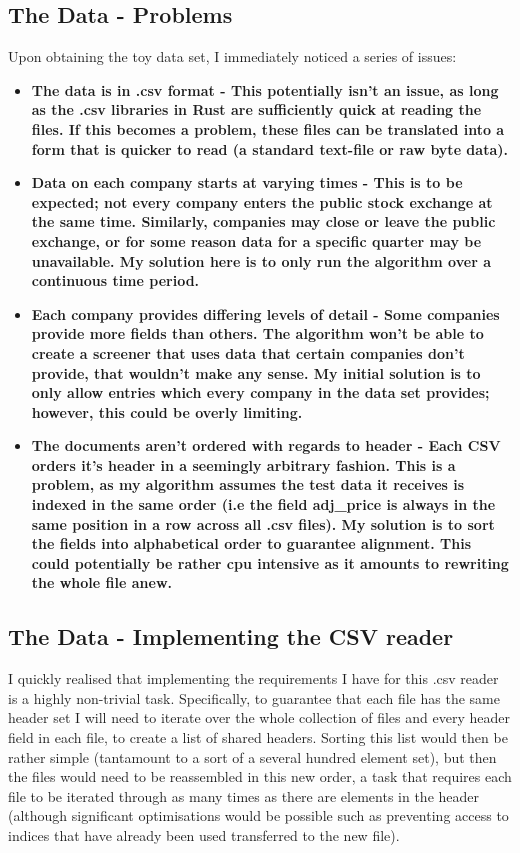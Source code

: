\subsection{The Data - Problems}
Upon obtaining the toy data set, I immediately noticed a series of issues:
\begin{itemize}
    \item \bf The data is in .csv format \rm - This potentially isn't an issue, as long as the .csv libraries in Rust are sufficiently quick at reading the files. If this becomes a problem, these files can be translated into a form that is quicker to read (a standard text-file or raw byte data).
    \item \bf Data on each company starts at varying times \rm - This is to be expected; not every company enters the public stock exchange at the same time. Similarly, companies may close or leave the public exchange, or for some reason data for a specific quarter may be unavailable. My solution here is to only run the algorithm over a continuous time period.
    \item \bf Each company provides differing levels of detail \rm - Some companies provide more fields than others. The algorithm won't be able to create a screener that uses data that certain companies don't provide, that wouldn't make any sense. My initial solution is to only allow entries which every company in the data set provides; however, this could be overly limiting.
    \item \bf The documents aren't ordered with regards to header \rm - Each CSV orders it's header in a seemingly arbitrary fashion. This is a problem, as my algorithm assumes the test data it receives is indexed in the same order (i.e the field adj\_price is always in the same position in a row across all .csv files). My solution is to sort the fields into alphabetical order to guarantee alignment. This could potentially be rather cpu intensive as it amounts to rewriting the whole file anew.
\end{itemize}

\subsection{The Data - Implementing the CSV reader} \label{DataCSVRead}
I quickly realised that implementing the requirements I have for this .csv reader is a highly non-trivial task. Specifically, to guarantee that each file has the same header set I will need to iterate over the whole collection of files and every header field in each file, to create a list of shared headers. Sorting this list would then be rather simple (tantamount to a sort of a several hundred element set), but then the files would need to be reassembled in this new order, a task that requires each file to be iterated through as many times as there are elements in the header (although significant optimisations would be possible such as preventing access to indices that have already been used transferred to the new file). \newline

